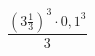 \begin{ex}[type=calculate]
	\begin{condition}
		\( \dfrac{\left( 3\frac{1}{3} \right)^3\cdot0,1^3}{3} \)
	\end{condition}
\end{ex}